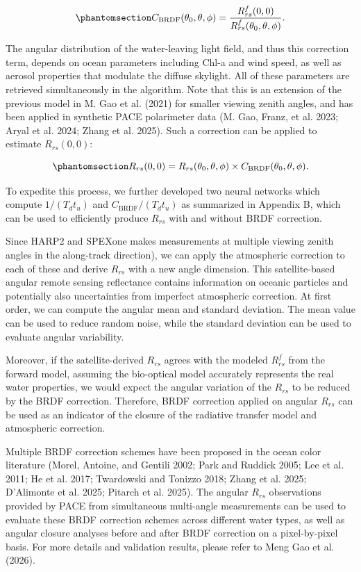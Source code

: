\documentclass[
  11pt,
  letterpaper,
  DIV=11,
  numbers=noendperiod]{scrreprt}
\begin{document}
\begin{equation}\phantomsection\label{eq-cbrdf}{
C_{\mathrm{BRDF}}(\theta_0,\theta,\phi)
=
\frac{R^f_{rs}(0,0)}
{R^f_{rs}(\theta_0,\theta,\phi)}.
}\end{equation}

The angular distribution of the water-leaving light field, and thus this
correction term, depends on ocean parameters including Chl-a and wind
speed, as well as aerosol properties that modulate the diffuse skylight.
All of these parameters are retrieved simultaneously in the algorithm.
Note that this is an extension of the previous model in M. Gao et al.
(2021) for smaller viewing zenith angles, and has been applied in
synthetic PACE polarimeter data (M. Gao, Franz, et al. 2023; Aryal et
al. 2024; Zhang et al. 2025). Such a correction can be applied to
estimate \(R_{rs}(0,0)\):

\begin{equation}\phantomsection\label{eq-rrs00}{
R_{rs}(0,0)
=
R_{rs}(\theta_0,\theta,\phi)
\times
C_{\mathrm{BRDF}}(\theta_0,\theta,\phi).
}\end{equation}

To expedite this process, we further developed two neural networks which
compute \(1/(T_d t_u)\) and \(C_{\mathrm{BRDF}}/(T_d t_u)\) as
summarized in Appendix B, which can be used to efficiently produce
\(R_{rs}\) with and without BRDF correction.

Since HARP2 and SPEXone makes measurements at multiple viewing zenith
angles in the along-track direction), we can apply the atmospheric
correction to each of these and derive \(R_{rs}\) with a new angle
dimension. This satellite-based angular remote sensing reflectance
contains information on oceanic particles and potentially also
uncertainties from imperfect atmospheric correction. At first order, we
can compute the angular mean and standard deviation. The mean value can
be used to reduce random noise, while the standard deviation can be used
to evaluate angular variability.

Moreover, if the satellite-derived \(R_{rs}\) agrees with the modeled
\(R^f_{rs}\) from the forward model, assuming the bio-optical model
accurately represents the real water properties, we would expect the
angular variation of the \(R_{rs}\) to be reduced by the BRDF
correction. Therefore, BRDF correction applied on angular \(R_{rs}\) can
be used as an indicator of the closure of the radiative transfer model
and atmospheric correction.

Multiple BRDF correction schemes have been proposed in the ocean color
literature (Morel, Antoine, and Gentili 2002; Park and Ruddick 2005; Lee
et al. 2011; He et al. 2017; Twardowski and Tonizzo 2018; Zhang et al.
2025; D'Alimonte et al. 2025; Pitarch et al. 2025). The angular
\(R_{rs}\) observations provided by PACE from simultaneous multi-angle
measurements can be used to evaluate these BRDF correction schemes
across different water types, as well as angular closure analyses before
and after BRDF correction on a pixel-by-pixel basis. For more details
and validation results, please refer to Meng Gao et al. (2026).
\end{document}
